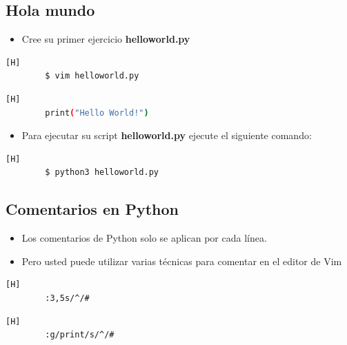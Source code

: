 \documentclass{article}
\begin{document}
	\subsection{Hola mundo}
	
	\begin{itemize}
		\item Cree su primer ejercicio \textbf{helloworld.py}
	\end{itemize}
	\begin{lstlisting}[language=bash,caption={Creando el archivo helloworld.py}][H]
		$ vim helloworld.py
	\end{lstlisting}
	\begin{lstlisting}[language=bash,caption={helloworld.py}][H]
		print("Hello World!")
	\end{lstlisting}
	\begin{itemize}
		\item Para ejecutar su script \textbf{helloworld.py} ejecute el siguiente comando:
	\end{itemize}
	\begin{lstlisting}[language=bash,caption={Ejecutando el script helloworld.py}][H]
		$ python3 helloworld.py
	\end{lstlisting}
	
	\subsection{Comentarios en Python}
	\begin{itemize}
		\item Los comentarios de Python solo se aplican por cada línea.
		\item Pero usted puede utilizar varias técnicas para comentar en el editor de Vim
	\end{itemize}
	
	\begin{lstlisting}[language=bash,caption={Comentar rango de 	líneas 5-10}][H]
		:3,5s/^/#
	\end{lstlisting}
	\begin{lstlisting}[language=bash,caption={Comentar todas las líneas que tengan la palabra print}][H]
		:g/print/s/^/#
	\end{lstlisting}
	
\end{document}
